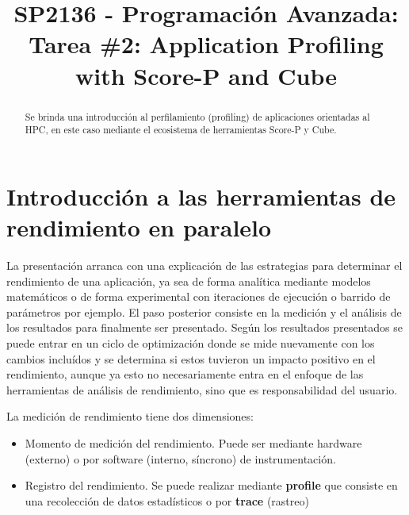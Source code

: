 \documentclass[conference]{IEEEtran}
\begin{document}
%
\title{\LARGE SP2136 - Programación Avanzada:\\
Tarea \#2: Application Profiling with Score-P and Cube}
%
\author{
}
\maketitle
%
\begin{abstract}
Se brinda una introducción al perfilamiento (profiling) de aplicaciones orientadas al HPC, en este caso mediante el ecosistema de herramientas Score-P y Cube.
\end{abstract}

\IEEEpeerreviewmaketitle

\section{Introducción a las herramientas de rendimiento en paralelo}
La presentación \cite{profiling_scorep} arranca con una explicación de las estrategias para determinar el rendimiento de una aplicación, ya sea de forma analítica mediante modelos matemáticos o de forma experimental con iteraciones de ejecución o barrido de parámetros por ejemplo. El paso posterior consiste en la medición y el análisis de los resultados para finalmente ser presentado. Según los resultados presentados se puede entrar en un ciclo de optimización donde se mide nuevamente con los cambios incluídos y se determina si estos tuvieron un impacto positivo en el rendimiento, aunque ya esto no necesariamente entra en el enfoque de las herramientas de análisis de rendimiento, sino que es responsabilidad del usuario.

La medición de rendimiento tiene dos dimensiones:
\begin{itemize}
\item Momento de medición del rendimiento. Puede ser mediante hardware (externo) o por software (interno, síncrono) de instrumentación.
\item Registro del rendimiento. Se puede realizar mediante \textbf{profile} que consiste en una recolección de datos estadísticos o por \textbf{trace} (rastreo)
\end{itemize}
\end{document}
